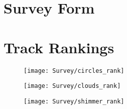 \documentclass[../initial_thesis.tex]{subfiles}
\begin{document}
\chapter{Survey Form} \label{appendix:survey}


\chapter{Track Rankings} \label{appendix:ranking}
\begin{figure}
  \centering
  \texttt{[image: Survey/circles\_rank]}
\end{figure}
\begin{figure}
  \centering
  \texttt{[image: Survey/clouds\_rank]}
\end{figure}
\begin{figure}
  \centering
  \texttt{[image: Survey/shimmer\_rank]}
\end{figure}
\end{document}
